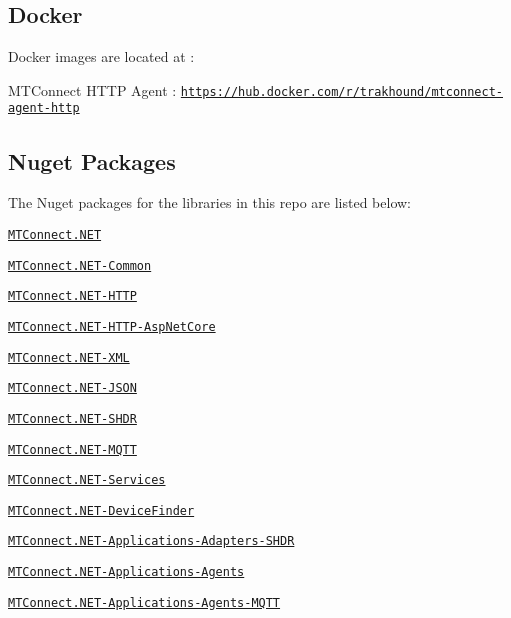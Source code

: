 \subsection*{Docker}

Docker images are located at \+:
\begin{DoxyItemize}
\item M\+T\+Connect H\+T\+TP Agent \+: \href{https://hub.docker.com/r/trakhound/mtconnect-agent-http}{\tt https\+://hub.\+docker.\+com/r/trakhound/mtconnect-\/agent-\/http}
\end{DoxyItemize}

\subsection*{Nuget Packages}

The Nuget packages for the libraries in this repo are listed below\+:
\begin{DoxyItemize}
\item \href{https://www.nuget.org/packages/MTConnect.NET/}{\tt M\+T\+Connect.\+N\+ET}
\item \href{https://www.nuget.org/packages/MTConnect.NET-Common/}{\tt M\+T\+Connect.\+N\+ET-\/\+Common}
\item \href{https://www.nuget.org/packages/MTConnect.NET-HTTP/}{\tt M\+T\+Connect.\+N\+ET-\/\+H\+T\+TP}
\item \href{https://www.nuget.org/packages/MTConnect.NET-HTTP-AspNetCore/}{\tt M\+T\+Connect.\+N\+ET-\/\+H\+T\+T\+P-\/\+Asp\+Net\+Core}
\item \href{https://www.nuget.org/packages/MTConnect.NET-XML/}{\tt M\+T\+Connect.\+N\+ET-\/\+X\+ML}
\item \href{https://www.nuget.org/packages/MTConnect.NET-JSON/}{\tt M\+T\+Connect.\+N\+ET-\/\+J\+S\+ON}
\item \href{https://www.nuget.org/packages/MTConnect.NET-SHDR/}{\tt M\+T\+Connect.\+N\+ET-\/\+S\+H\+DR}
\item \href{https://www.nuget.org/packages/MTConnect.NET-MQTT/}{\tt M\+T\+Connect.\+N\+ET-\/\+M\+Q\+TT}
\item \href{https://www.nuget.org/packages/MTConnect.NET-Services/}{\tt M\+T\+Connect.\+N\+ET-\/\+Services}
\item \href{https://www.nuget.org/packages/MTConnect.NET-DeviceFinder/}{\tt M\+T\+Connect.\+N\+ET-\/\+Device\+Finder}
\item \href{https://www.nuget.org/packages/MTConnect.NET-Applications-Adapters-SHDR/}{\tt M\+T\+Connect.\+N\+ET-\/\+Applications-\/\+Adapters-\/\+S\+H\+DR}
\item \href{https://www.nuget.org/packages/MTConnect.NET-Applications-Agents/}{\tt M\+T\+Connect.\+N\+ET-\/\+Applications-\/\+Agents}
\item \href{https://www.nuget.org/packages/MTConnect.NET-Applications-Agents-MQTT/}{\tt M\+T\+Connect.\+N\+ET-\/\+Applications-\/\+Agents-\/\+M\+Q\+TT}
\end{DoxyItemize}

